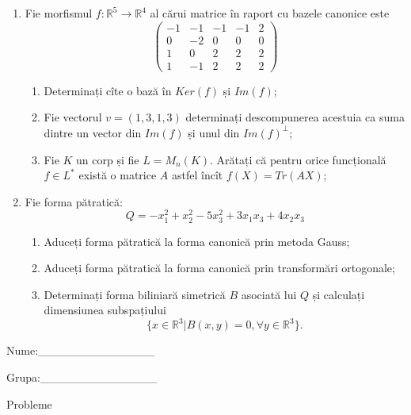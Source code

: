 \documentclass{article}
\begin{document}
\begin{enumerate}
 \item Fie morfismul $f:\mathbb{R}^5 \to \mathbb{R}^4$ al cărui matrice în raport cu bazele canonice este
$$\begin{pmatrix}
-1&-1&-1&-1&2\\
0&-2&0&0&0\\
1&0&2&2&2\\
1&-1&2&2&2
\end{pmatrix}$$

\begin{enumerate}
\item Determinați cîte o bază în $Ker(f)$ și $Im(f)$;
\item Fie vectorul $v=(1,3,1,3)$ determinați descompunerea acestuia ca suma dintre un vector din $Im(f)$ și unul din $Im(f)^\perp$;
\item Fie $K$ un corp și fie $L=M_n(K)$. Arătați că pentru orice funcțională $f \in L^*$ există o matrice $A$ astfel încît $f(X)=Tr(AX)$;
\end{enumerate}
\item Fie forma pătratică:
$$Q= -x_1^2+x_2^2-5x_3^2+3x_1x_3+4x_2x_3$$

\begin{enumerate}
\item Aduceți forma pătratică la forma canonică prin metoda Gauss;
\item Aduceți forma pătratică la forma canonică prin transformări ortogonale;
\item Determinați forma biliniară simetrică $B$ asociată lui $Q$ și calculați dimensiunea subspațiului
$$\{x \in \mathbb{R}^3 | B(x,y)=0,\forall y \in \mathbb{R}^3\}.$$

\end{enumerate}
\end{enumerate}
\newpage
\begin{flushright}
Nume:\_\_\_\_\_\_\_\_\_\_\_\_\_\_
 
 
Grupa:\_\_\_\_\_\_\_\_\_\_\_\_\_\_
\end{flushright}
\begin{center}
\vspace{2cm}
{\Large Probleme}
\vspace{2cm}
\end{center}
\end{document}

